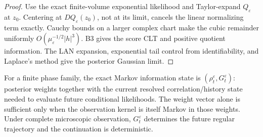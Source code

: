 \begin{proof}
Use the exact finite-volume exponential likelihood and Taylor-expand
\(Q_\varepsilon\) at \(z_0\).  Centering at
\(DQ_\varepsilon(z_0)\), not at its limit, cancels the linear normalizing
term exactly.  Cauchy bounds on a larger complex chart make the cubic remainder
uniformly \(O(\mu_\varepsilon^{-1/2}|h|^3)\).  B3 gives the score CLT and
positive quotient information.  The LAN expansion, exponential tail control
from identifiability, and Laplace's method give the posterior Gaussian limit.
\end{proof}

For a finite phase family, the exact Markov information state is
\((\rho_t^\varepsilon,G_t^\varepsilon)\): posterior weights together with the
current resolved correlation/history state needed to evaluate future
conditional likelihoods.  The weight vector alone is sufficient only when the
observation kernel is itself Markov in those weights.  Under complete
microscopic observation, \(G_t^\varepsilon\) determines the future regular
trajectory and the continuation is deterministic.
